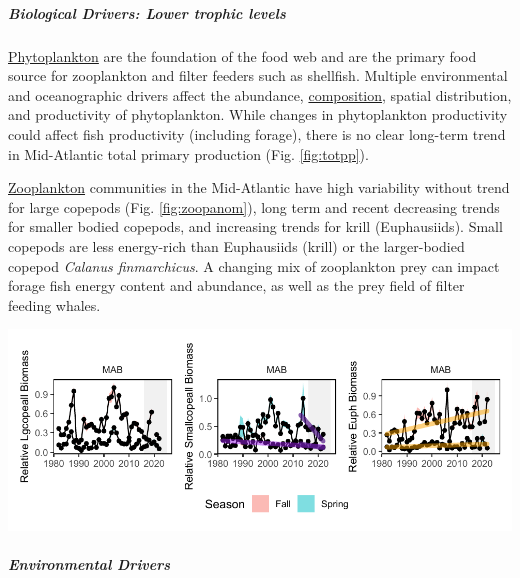 \documentclass[
  10pt,
]{article}
\let\origfigure\figure
\let\endorigfigure\endfigure
\renewenvironment{figure}[1][2] {
    \expandafter\origfigure\expandafter[H]
} {
    \endorigfigure
}
\begin{document}
\subparagraph{Biological Drivers: Lower trophic levels}\label{biological-drivers-lower-trophic-levels}

\href{https://noaa-edab.github.io/catalog/chl_pp.html}{Phytoplankton} are the foundation of the food web and are the primary food source for zooplankton and filter feeders such as shellfish. Multiple environmental and oceanographic drivers affect the abundance, \href{https://noaa-edab.github.io/catalog/chl_pp.html}{composition}, spatial distribution, and productivity of phytoplankton. While changes in phytoplankton productivity could affect fish productivity (including forage), there is no clear long-term trend in Mid-Atlantic total primary production (Fig. \ref{fig:totpp}).

\href{https://noaa-edab.github.io/catalog/zoo_abundance_anom.html}{Zooplankton} communities in the Mid-Atlantic have high variability without trend for large copepods (Fig. \ref{fig:zoopanom}), long term and recent decreasing trends for smaller bodied copepods, and increasing trends for krill (Euphausiids). Small copepods are less energy-rich than Euphausiids (krill) or the larger-bodied copepod \emph{Calanus finmarchicus}. A changing mix of zooplankton prey can impact forage fish energy content and abundance, as well as the prey field of filter feeding whales.

\begin{figure}

{\centering \includegraphics{midatlantic_files/figure-latex/zoopanom-1} 

}

\caption{Changes in zooplankton abundance in the MAB for large (left) and small (center) copepods, and Euphausiids (right), with significant decreases (purple) in small copepods and increases (orange) in Euphausiids.}\label{fig:zoopanom}
\end{figure}

\subparagraph{Environmental Drivers}\label{environmental-drivers}
\end{document}
